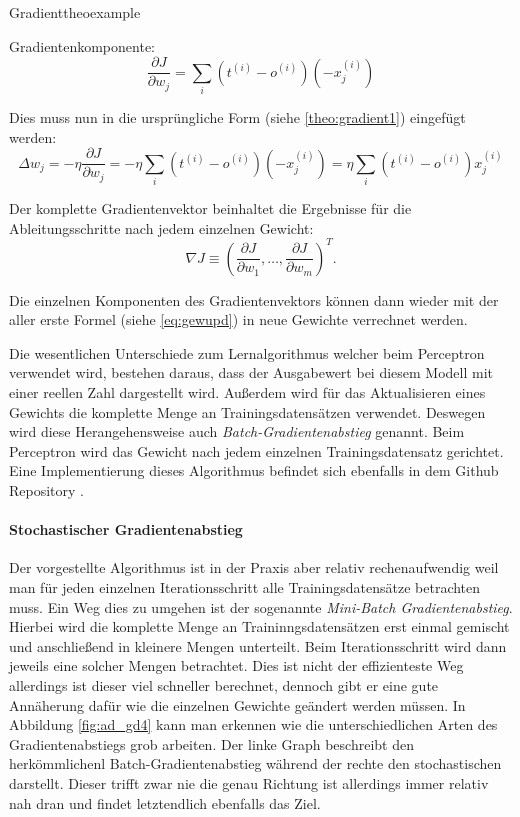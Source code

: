 \begin{mytheo}{Gradient}{theoexample}

Gradientenkomponente: 
\begin{equation}
\frac{\partial J}{\partial w_j} = \sum_i  (t^{(i)} - o^{(i)})(-x^{(i)}_{j})
\end{equation}

Dies muss nun in die ursprüngliche Form (siehe \ref{theo:gradient1}) eingefügt werden: 
\begin{equation}
\Delta w_j = - \eta \frac{\partial J}{\partial w_j} = - \eta \sum_i  (t^{(i)} - o^{(i)})(- x^{(i)}_{j}) = \eta \sum_i (t^{(i)} - o^{(i)})x^{(i)}_{j}
\end{equation}

Der komplette Gradientenvektor beinhaltet die Ergebnisse für die Ableitungsschritte nach jedem einzelnen Gewicht:
\begin{equation}
  \nabla J \equiv \left(\frac{\partial J}{\partial w_1}, \ldots, 
  \frac{\partial J}{\partial w_m}\right)^T.
\end{equation}

\end{mytheo}

Die einzelnen Komponenten des Gradientenvektors können dann wieder mit der aller erste Formel (siehe \ref{eq:gewupd}) in neue Gewichte verrechnet werden. 

Die wesentlichen Unterschiede zum Lernalgorithmus welcher beim Perceptron verwendet wird, bestehen daraus, dass der Ausgabewert bei diesem Modell mit einer reellen Zahl dargestellt wird. Außerdem wird für das Aktualisieren eines Gewichts die komplette Menge an Trainingsdatensätzen verwendet. Deswegen wird diese Herangehensweise auch \emph{Batch-Gradientenabstieg} genannt. Beim Perceptron wird das Gewicht nach jedem einzelnen Trainingsdatensatz gerichtet. Eine Implementierung dieses Algorithmus befindet sich ebenfalls in dem Github Repository \cite{pcImplementierung}. 

\paragraph{Stochastischer Gradientenabstieg}
Der vorgestellte Algorithmus ist in der Praxis aber relativ rechenaufwendig weil man für jeden einzelnen Iterationsschritt alle Trainingsdatensätze betrachten muss. Ein Weg dies zu umgehen ist der sogenannte \emph{Mini-Batch Gradientenabstieg}. Hierbei wird die komplette Menge an Traininngsdatensätzen erst einmal gemischt und anschließend in kleinere Mengen unterteilt. Beim Iterationsschritt wird dann jeweils eine solcher Mengen betrachtet. Dies ist nicht der effizienteste Weg allerdings ist dieser viel schneller berechnet, dennoch gibt er eine gute Annäherung dafür wie die einzelnen Gewichte geändert werden müssen. In Abbildung \ref{fig:ad_gd4} kann man erkennen wie die unterschiedlichen Arten des Gradientenabstiegs grob arbeiten. Der linke Graph beschreibt den \glqq herkömmlichenl \grqq Batch-Gradientenabstieg während der rechte den stochastischen darstellt. Dieser trifft zwar nie die genau Richtung ist allerdings immer relativ nah dran und findet letztendlich ebenfalls das Ziel. 

